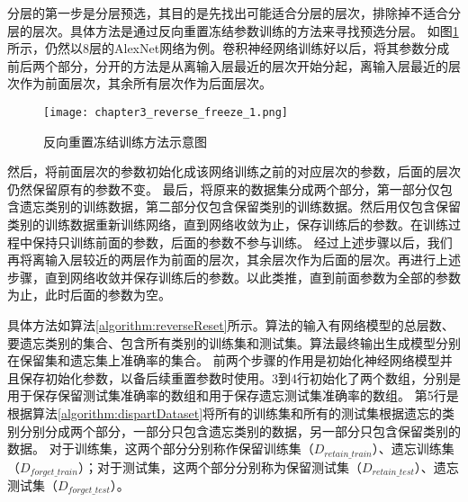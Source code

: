 分层的第一步是分层预选，其目的是先找出可能适合分层的层次，排除掉不适合分层的层次。具体方法是通过反向重置冻结参数训练的方法来寻找预选分层。
如图\ref{fig:chapter3_reverse_freeze_1}所示，仍然以8层的AlexNet网络为例。卷积神经网络训练好以后，将其参数分成前后两个部分，分开的方法是从离输入层最近的层次开始分起，离输入层最近的层次作为前面层次，其余所有层次作为后面层次。
\begin{figure}
    \centering
    \texttt{[image: chapter3\_reverse\_freeze\_1.png]}
    \caption{反向重置冻结训练方法示意图}
    \label{fig:chapter3_reverse_freeze_1}
\end{figure}
然后，将前面层次的参数初始化成该网络训练之前的对应层次的参数，后面的层次仍然保留原有的参数不变。
最后，将原来的数据集分成两个部分，第一部分仅包含遗忘类别的训练数据，第二部分仅包含保留类别的训练数据。然后用仅包含保留类别的训练数据重新训练网络，直到网络收敛为止，保存训练后的参数。在训练过程中保持只训练前面的参数，后面的参数不参与训练。
经过上述步骤以后，我们再将离输入层较近的两层作为前面的层次，其余层次作为后面的层次。再进行上述步骤，直到网络收敛并保存训练后的参数。以此类推，直到前面参数为全部的参数为止，此时后面的参数为空。

具体方法如算法\ref{algorithm:reverseReset}所示。算法的输入有网络模型的总层数、要遗忘类别的集合、包含所有类别的训练集和测试集。算法最终输出生成模型分别在保留集和遗忘集上准确率的集合。
前两个步骤的作用是初始化神经网络模型并且保存初始化参数，以备后续重置参数时使用。3到4行初始化了两个数组，分别是用于保存保留测试集准确率的数组和用于保存遗忘测试集准确率的数组。
第5行是根据算法\ref{algorithm:dispartDataset}将所有的训练集和所有的测试集根据遗忘的类别分别分成两个部分，一部分只包含遗忘类别的数据，另一部分只包含保留类别的数据。
对于训练集，这两个部分分别称作保留训练集（$D_{retain\_train}$）、遗忘训练集（$D_{forget\_train}$）；对于测试集，这两个部分分别称为保留测试集（$D_{retain\_test}$）、遗忘测试集（$D_{forget\_test}$）。

